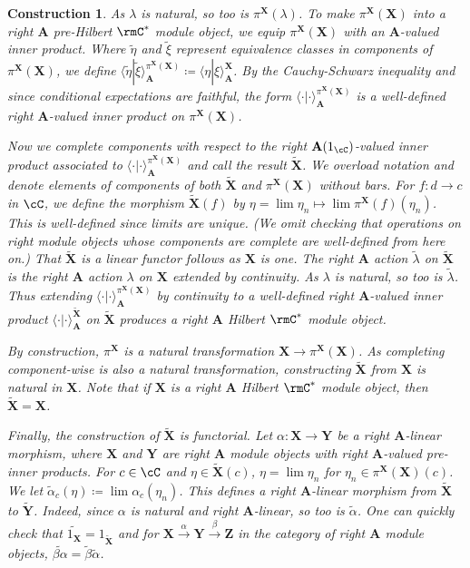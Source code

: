 \documentclass[11pt,reqno]{amsart}
\newcommand{\bb}[1]{\mathbf{#1}}
\numberwithin{equation}{section}
\theoremstyle{plain}
\newtheorem{const}[thm]{Construction}
\begin{document}
\begin{const}
As $\lambda$ is natural, so too is $\pi^{\bb X}(\lambda)$.
To make $\pi^{\bb X}(\bb X)$ into a right $\bb A$ pre-Hilbert $\rmC^*$ module object, we equip $\pi^{\bb X}(\bb X)$ with an $\bb A$-valued inner product.
Where $\widetilde{\eta}$ and $\widetilde{\xi}$ represent equivalence classes in components of $\pi^{\bb X}(\bb X)$, we define $\langle \widetilde{\eta} | \widetilde{\xi} \rangle_{\bb A}^{\pi^{\bb X}(\bb X)} \coloneq \langle \eta | \xi \rangle_{\bb A}^{\bb X}$.
By the Cauchy-Schwarz inequality and since conditional expectations are faithful, the form $\langle \cdot | \cdot \rangle_{\bb A}^{\pi^{\bb X}(\bb X)}$ is a well-defined right $\bb A$-valued inner product on $\pi^{\bb X}(\bb X)$.

Now we complete components with respect to the right $\bb A(1_{\cC})$-valued inner product associated to $\langle \cdot | \cdot \rangle_{\bb A}^{\pi^{\bb X}(\bb X)}$ and call the result $\widetilde{\bb X}$.
We overload notation and denote elements of components of both $\widetilde{\bb X}$ and $\pi^{\bb X}(\bb X)$ without bars.
For $f \colon d \to c $ in $\cC$, we define the morphism $\widetilde{\bb X}(f)$ by $\eta = \lim \eta_n \mapsto \lim \pi^{\bb X}(f)(\eta_n)$.
This is well-defined since limits are unique.
(We omit checking that operations on right module objects whose components are complete are well-defined from here on.)
That $\widetilde{\bb X}$ is a linear functor follows as $\bb X$ is one.
The right $\bb A$ action $\widetilde{\lambda}$ on $\widetilde{\bb X}$ is the right $\bb A$ action $\lambda$ on $\bb X$ extended by continuity.
As $\lambda$ is natural, so too is $\widetilde{\lambda}$.
Thus extending $\langle \cdot | \cdot \rangle_{\bb A}^{\pi^{\bb X}(\bb X)}$ by continuity to a well-defined right $\bb A$-valued inner product $\langle \cdot | \cdot \rangle_{\bb A}^{\widetilde{\bb X}}$ on $\widetilde{\bb X}$ produces a right $\bb A$ Hilbert $\rmC^*$ module object.

By construction, $\pi^{\bb X}$ is a natural transformation $\bb X \to \pi^{\bb X}(\bb X)$.
As completing component-wise is also a natural transformation, constructing $\widetilde{\bb X}$ from $\bb X$ is natural in $\bb X$.
Note that if $\bb X$ is a right $\bb A$ Hilbert $\rmC^*$ module object, then $\widetilde{\bb X} = \bb X$.

Finally, the construction of $\widetilde{\bb X}$ is functorial.
Let $\alpha \colon \bb X \to \bb Y$ be a right $\bb A$-linear morphism, where $\bb X$ and $\bb Y$ are right $\bb A$ module objects with right $\bb A$-valued pre-inner products.
For $c \in \cC$ and $\eta \in \widetilde{\bb X}(c)$, $\eta = \lim \eta_n$ for $\eta_n \in \pi^{\bb X}(\bb X)(c)$.
We let $\widetilde{\alpha}_c(\eta) \coloneq \lim \alpha_c(\eta_n)$.
This defines a right $\bb A$-linear morphism from $\widetilde{\bb X}$ to $\widetilde{\bb Y}$.
Indeed, since $\alpha$ is natural and right $\bb A$-linear, so too is $\widetilde{\alpha}$.
One can quickly check that $\widetilde{1_{\bb X}} = 1_{\widetilde{\bb X}}$ and for $\bb X \stackrel{\alpha}{\to} \bb Y \stackrel{\beta}{\to} \bb Z$ in the category of right $\bb A$ module objects, $\widetilde{\beta \alpha} = \widetilde{\beta} \widetilde{\alpha}$.
\end{const}
\end{document}
